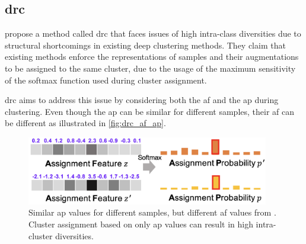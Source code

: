 \subsection{\acl{drc}}\label{subsec:drc}

\citeauthor{DRC_2020} propose a method called \ac{drc} 
that faces issues of high intra-class diversities 
due to structural shortcomings in existing deep clustering methods.
They claim that existing methods enforce the representations of samples 
and their augmentations to be assigned to the same cluster,
due to the usage of the maximum sensitivity of the softmax function used during cluster assignment.

\ac{drc} aims to address this issue by considering both the \ac{af} and the \ac{ap} during clustering.
Even though the \ac{ap} can be similar for different samples, their \ac{af} can be different 
as illustrated in \autoref{fig:drc_af_ap}.

\begin{figure}[h] %
    \centering
    \includegraphics[width=300pt]{images/DRC_af_ap.png}
    \caption{Similar \ac{ap} values for different samples, but different \ac{af} values from \citet{DRC_2020}.
    Cluster assignment based on only \ac{ap} values can result in high intra-cluster diversities.}
    \label{fig:drc_af_ap}
\end{figure}